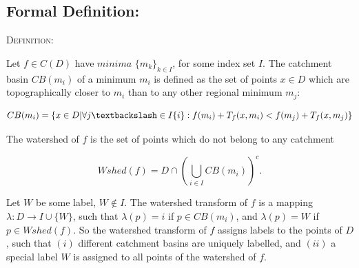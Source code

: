\documentclass{article}
\begin{document}
\subsection{Formal Definition:}
\begin{flushleft}
\vspace{2mm }
\begin{tcolorbox}
\textsc{Definition: }\cite{parwshed} \newline\newline

Let $f \in C(D)$ have $minima$ $\{m_{k}\}_{k \in I}$, for some index set $I$. The catchment basin $CB(m_i)$ of a minimum $m_i$ is defined as the set of points $x \in D$ which are topographically closer to $m_i$ than to any other regional minimum $m_j$:

\newline

\begin{center}
\begin{equation*}
    CB(m_i) = \{x \in D | \forall j \textbackslash \in I\{i\} : f(m_i) + T_f(x, m_i) < f(m_j) + T_f(x, m_j)\}
\end{equation*}
\end{center}
\vspace{2mm}
The watershed of $f$ is the set of points which do not belong to any catchment
\begin{center}
\begin{equation*}
Wshed(f) = D \cap \left(\bigcup\limits_{i \in I} CB(m_i)\right)^c.
\end{equation*}
\end{center}
\vspace{4mm}
Let $W$ be some label, $W \notin I$. The watershed transform of $f$ is a mapping $\lambda : D \to I \cup \{W\}$, such that $\lambda(p) = i$ if $p \in CB(m_i)$, and $\lambda(p) = W$ if $p \in Wshed(f)$.
\newline\newline\newline
So the watershed transform of $f$ assigns labels to the points of $D$, such that $(i)$ different catchment basins are uniquely labelled, and $(ii)$ a special label $W$ is assigned to all points of the watershed of $f$.
\end{tcolorbox}
\end{flushleft}
\end{document}
